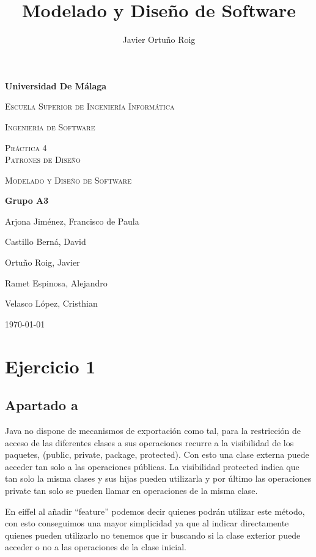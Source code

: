 \documentclass[11pt,a4paper]{article}
\author{Javier Ortuño Roig}
\title{Modelado y Diseño de Software}
\begin{document}
\begin{titlepage}
\centering
{\bfseries\LARGE Universidad De Málaga \par}
\vspace{0.5cm}
{\scshape\Large Escuela Superior de Ingeniería Informática  \par}
\vspace{0.5cm}
{\scshape\Large Ingeniería de Software  \par}
\vspace{3cm}
{\scshape\Huge Práctica 4 \\ Patrones de Diseño \par}
\vspace{1.5cm}
{\scshape\Large Modelado y Diseño de Software \par}
\vspace{3cm}
{\Large \textbf{Grupo A3} \par}
{\Large Arjona Jiménez, Francisco de Paula \par}
{\Large Castillo Berná, David \par}
{\Large Ortuño Roig, Javier \par}
{\Large Ramet Espinosa, Alejandro \par}
{\Large Velasco López, Cristhian \par}
\vfill
{\Large \today \par}
\end{titlepage}

\tableofcontents

\newpage

\section{Ejercicio 1}
\subsection{Apartado a}

Java no dispone de mecanismos de exportación como tal, para la restricción de acceso de las diferentes clases a sus operaciones recurre a la visibilidad de los paquetes, (public, private, package, protected). Con esto una clase externa puede acceder tan solo a las operaciones públicas. La visibilidad protected indica que tan solo la misma clases y sus hijas pueden utilizarla y por último las operaciones private tan solo se pueden llamar en operaciones de la misma clase. 

	En eiffel al añadir ``feature'' podemos decir quienes podrán utilizar este método, con esto conseguimos una mayor simplicidad ya que al indicar directamente quienes pueden utilizarlo no tenemos que ir buscando si la clase exterior puede acceder o no a las operaciones de la clase inicial.
\end{document}
